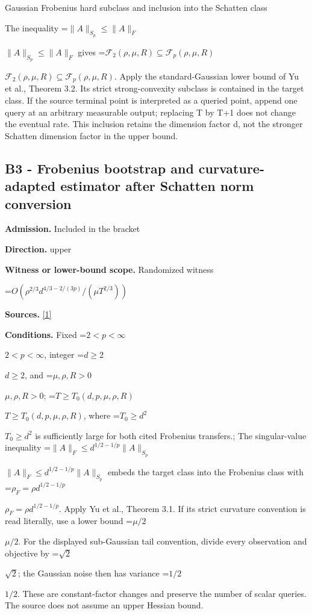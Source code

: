 \documentclass[10pt,a4paper]{article}
\newcommand{\AtlasMath}[1]{\par\begingroup\centering\setbox0=\hbox{$\displaystyle #1$}\ifdim\wd0>1.4\linewidth\typeout{ATLAS WIDE FORMULA: \the\wd0}\fi\ifdim\wd0>\linewidth\resizebox{\linewidth}{!}{\box0}\else\box0\fi\par\endgroup}
\newcommand{\AtlasInlineMath}[1]{\begingroup\setbox0=\hbox{$#1$}\ifdim\wd0>.4\linewidth\endgroup\AtlasMath{#1}\else\endgroup$#1$\fi}
\begin{document}
Gaussian Frobenius hard subclass and inclusion into the Schatten class



The inequality \AtlasInlineMath{\|A\|_{S_p}\le\|A\|_F} gives \AtlasInlineMath{\mathcal F_2(\rho,\mu,R)\subseteq\mathcal F_p(\rho,\mu,R)}. Apply the standard-Gaussian lower bound of Yu et al., Theorem 3.2. Its strict strong-convexity subclass is contained in the target class. If the source terminal point is interpreted as a queried point, append one query at an arbitrary measurable output; replacing T by T+1 does not change the eventual rate. This inclusion retains the dimension factor d, not the stronger Schatten dimension factor in the upper bound.



\subsection{B3 - Frobenius bootstrap and curvature-adapted estimator after Schatten norm conversion}


\textbf{Admission.} Included in the bracket



\textbf{Direction.} upper



\textbf{Witness or lower-bound scope.} Randomized witness



\AtlasMath{O(\rho^{2/3}d^{4/3-2/(3p)}/(\mu T^{2/3}))}


\textbf{Sources.} \href{https://papers.nips.cc/paper_files/paper/2024/file/b444ad72520a5f5c467343be88e352ed-Paper-Conference.pdf}{[1]}



\textbf{Conditions.} Fixed \AtlasInlineMath{2<p<\infty}, integer \AtlasInlineMath{d\ge2}, and \AtlasInlineMath{\mu,\rho,R>0}; \AtlasInlineMath{T\ge T_0(d,p,\mu,\rho,R)}, where \AtlasInlineMath{T_0\ge d^2} is sufficiently large for both cited Frobenius transfers.; The singular-value inequality \AtlasInlineMath{\|A\|_F\le d^{1/2-1/p}\|A\|_{S_p}} embeds the target class into the Frobenius class with \AtlasInlineMath{\rho_F=\rho d^{1/2-1/p}}. Apply Yu et al., Theorem 3.1. If its strict curvature convention is read literally, use a lower bound \AtlasInlineMath{\mu/2}. For the displayed sub-Gaussian tail convention, divide every observation and objective by \AtlasInlineMath{\sqrt2}; the Gaussian noise then has variance \AtlasInlineMath{1/2}. These are constant-factor changes and preserve the number of scalar queries. The source does not assume an upper Hessian bound.
\end{document}
